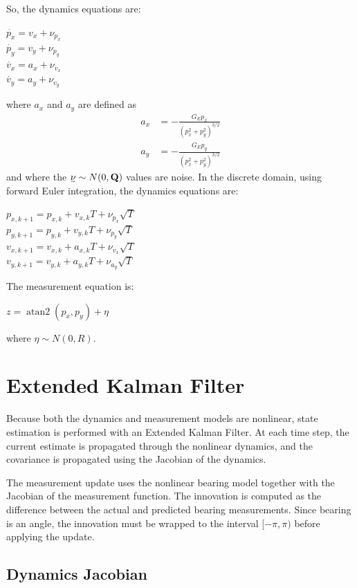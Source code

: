 \documentclass[11pt, letterpaper, twocolumn]{article}
\newcommand{\ul}[1] %
    {{}\mkern1mu\underline{\mkern-1mu#1\mkern-1mu}\mkern1mu}
\begin{document}
So, the dynamics equations are:
\begin{center}
    $\dot{p_x} = v_x + \nu_{p_x}$
    \\
    $\dot{p_y} = v_y + \nu_{p_y}$
    \\
    $\dot{v_x} = a_x + \nu_{v_x}$
    \\
    $\dot{v_y} = a_y + \nu_{v_y}$
\end{center}
where $a_x$ and $a_y$ are defined as
\[\begin{aligned}
a_x &= -\frac{G_Ep_x}{(p_x^2+p_y^2)^{3/2}} \\
a_y &= -\frac{G_Ep_y}{(p_x^2+p_y^2)^{3/2}}
\end{aligned}
\]
and where the $\ul{\nu} \sim N(0,\mathbf{Q})$ values are noise. In the discrete domain, using
forward Euler integration, the dynamics equations are:
\begin{center}
    $p_{x,k+1} = p_{x,k} + v_{x,k}T + \nu_{p_x}\sqrt{T}$
    \\
    $p_{y,k+1} = p_{y,k} + v_{y,k}T + \nu_{p_y}\sqrt{T}$
    \\
    $v_{x,k+1} = v_{x,k} + a_{x,k}T + \nu_{v_x}\sqrt{T}$
    \\
    $v_{y,k+1} = v_{y,k} + a_{y,k}T + \nu_{a_y}\sqrt{T}$
\end{center}
The measurement equation is:
\begin{center}
    $z = \operatorname{atan2}(p_x,p_y) + \eta$
\end{center}
where $\eta \sim N(0,R)$.

\section*{Extended Kalman Filter}

Because both the dynamics and measurement models are nonlinear, state estimation is performed
with an Extended Kalman Filter. At each time step, the current estimate is propagated 
through the nonlinear dynamics, and the covariance is propagated using the Jacobian of 
the dynamics.

The measurement update uses the nonlinear bearing model together with the Jacobian of the
measurement function. The innovation is computed as the difference between the actual
and predicted bearing measurements. Since bearing is an angle, the innovation must be
wrapped to the interval $[-\pi,\pi)$ before applying the update.

\subsection*{Dynamics Jacobian}
\end{document}
